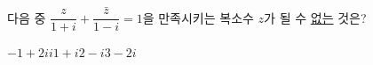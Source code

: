 다음 중 $\dfrac{z}{1+i}+\dfrac{\bar{z}}{1-i}=1$을 만족시키는 복소수 $z$가 될 수 \underline{없는} 것은? 
\begin{choices32}{$-1+2i$}{$i$}{$1+i$}{$2-i$}{$3-2i$}\end{choices32}
